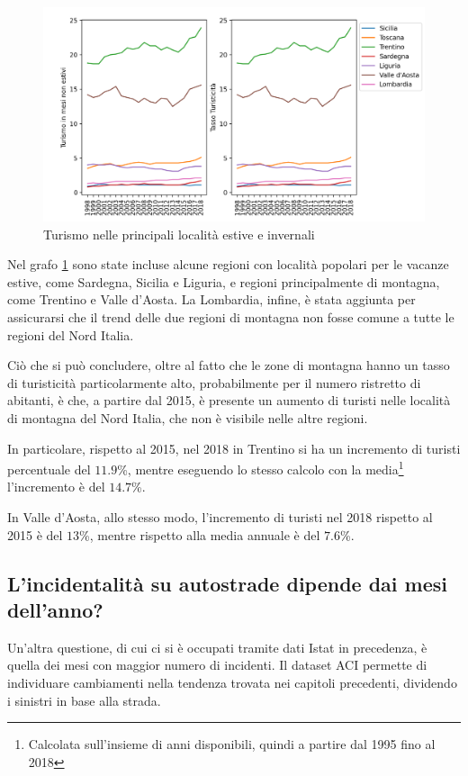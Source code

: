 \documentclass[a4paper,12pt]{report}
\begin{document}
\begin{figure}
    \includegraphics[width=\linewidth]{../src/turismo/turismo.png}
    \caption{Turismo nelle principali località estive e invernali}
    \label{fig:turismo}
\end{figure}

Nel grafo \ref{fig:turismo} sono state incluse alcune regioni con località popolari 
per le vacanze estive, come Sardegna, Sicilia e Liguria, e regioni principalmente 
di montagna, come Trentino e Valle d'Aosta. 
La Lombardia, infine, è stata aggiunta per assicurarsi che il trend delle due regioni 
di montagna non fosse comune a tutte le regioni del Nord Italia.

Ciò che si può concludere, oltre al fatto che le zone di montagna hanno 
un tasso di turisticità particolarmente alto, probabilmente per il numero 
ristretto di abitanti, 
è che, a partire dal 2015, è presente un aumento di turisti nelle località 
di montagna del Nord Italia, che non è visibile nelle altre regioni.

In particolare, rispetto al 2015, nel 2018 in Trentino si ha un incremento 
di turisti percentuale del $11.9$\%, mentre eseguendo lo stesso calcolo con la 
media\footnote{Calcolata sull'insieme di anni disponibili, quindi 
a partire dal 1995 fino al 2018} l'incremento è del $14.7$\%.

In Valle d'Aosta, allo stesso modo, l'incremento di turisti nel 2018 
rispetto al 2015 è del $13$\%, mentre rispetto alla media annuale 
è del $7.6$\%.

\subsection{L'incidentalità su autostrade dipende dai mesi dell'anno?}

Un'altra questione, di cui ci si è occupati tramite dati Istat in precedenza, è 
quella dei mesi con maggior numero di incidenti.
Il dataset ACI permette di individuare cambiamenti nella tendenza trovata nei 
capitoli precedenti, dividendo i sinistri in base alla strada.
\end{document}
